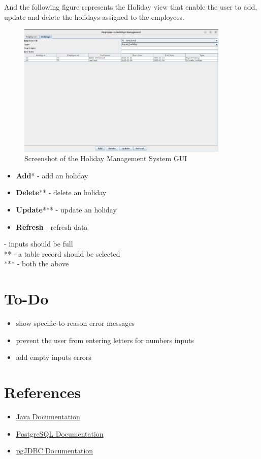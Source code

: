 \documentclass[12pt]{article}
\begin{document}
\pagebreak

And the following figure represents the Holiday view that enable
the user to add, update and delete the holidays assigned to the
employees.

\begin{figure}[H]
  \centering
  \includegraphics[width=0.9\textwidth]{holiday_preview.png}
  \caption{Screenshot of the Holiday Management System GUI}
\end{figure}

\begin{itemize}
    \item \textbf{Add}* - add an holiday
    \item \textbf{Delete}** - delete an holiday
	\item \textbf{Update}*** - update an holiday
    \item \textbf{Refresh} - refresh data
\end{itemize}

\noindent * - inputs should be full\\
** - a table record should be selected\\
*** - both the above

\pagebreak

\section{To-Do}

\begin{itemize}
    \item show specific-to-reason error messages
	\item prevent the user from entering letters for numbers inputs
	\item add empty inputs errors
\end{itemize}

\section{References}
\begin{itemize}
    \item \href{https://docs.oracle.com/en/java/}{Java Documentation}
    \item \href{https://www.postgresql.org/docs/}{PostgreSQL Documentation}
    \item \href{https://jdbc.postgresql.org/documentation/}{pgJDBC Documentation}
\end{itemize}
\end{document}
